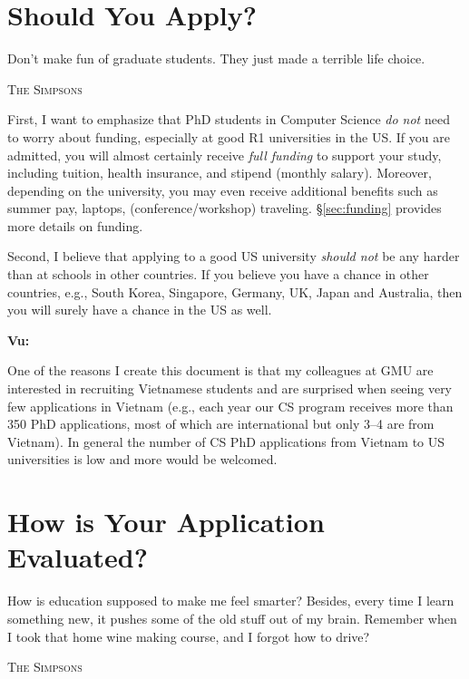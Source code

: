\documentclass[11pt]{article}
\newenvironment{commentbox}[1][]{
\small
    \begin{cbox}
    \textbf{#1} 
 }{
   \end{cbox}
}
\begin{document}
\section{Should You Apply?}
\epigraph{\vspace{-0.2in} Don't make fun of graduate students. They just made a terrible life choice.}{\textsc{The Simpsons}}

First, I want to emphasize that PhD students in Computer Science \emph{do not} need to worry about funding, especially at good R1
universities in the US. If you are admitted, you will almost certainly
receive \emph{full funding} to support your study, including tuition,
health insurance, and stipend (monthly salary). Moreover, depending on the university,
you may even receive additional benefits such as summer pay, laptops, (conference/workshop) traveling. \S\ref{sec:funding} provides more details on funding.

Second, I believe that applying to a good US university \emph{should not} be any
harder than at schools in other countries. If you believe you have a chance in other countries, e.g., South Korea, Singapore, Germany, UK, Japan and Australia, then you will surely have a chance in the US as well.

\begin{commentbox}[Vu:]
One of the reasons I create this document is that my colleagues at GMU are interested in recruiting Vietnamese students and are surprised when seeing very few applications in Vietnam (e.g., each year our CS program receives more than 350 PhD applications, most of which are international but only 3--4 are from Vietnam). In general the number of CS PhD applications from Vietnam to US universities is low and more would be welcomed. 
\end{commentbox}



\section{How is Your Application Evaluated?}

\epigraph{How is education supposed to make me feel smarter? Besides, every time I learn something new, it pushes some of the old stuff out of my brain. Remember when I took that home wine making course, and I forgot how to drive?}{\textsc{The Simpsons}}
\end{document}
